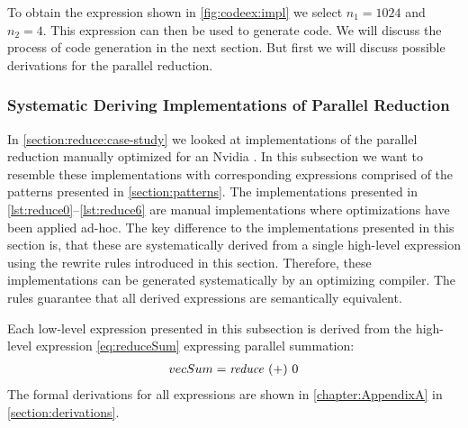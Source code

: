 To obtain the expression shown in \autoref{fig:codeex:impl} we select $n_1=1024$ and $n_2=4$.
This expression can then be used to generate \OpenCL code.
We will discuss the process of \OpenCL code generation in the next section.
But first we will discuss possible derivations for the parallel reduction.












\subsubsection{Systematic Deriving Implementations of Parallel Reduction}

In \autoref{section:reduce:case-study} we looked at implementations of the parallel reduction manually optimized for an Nvidia \GPU.
In this subsection we want to resemble these implementations with corresponding expressions comprised of the patterns presented in \autoref{section:patterns}.
The implementations presented in \autoref{lst:reduce0}--\autoref{lst:reduce6} are manual implementations where optimizations have been applied ad-hoc.
The key difference to the implementations presented in this section is, that these are systematically derived from a single high-level expression using the rewrite rules introduced in this section.
Therefore, these implementations can be generated systematically by an optimizing compiler.
The rules guarantee that all derived expressions are semantically equivalent.

Each \OpenCL low-level expression presented in this subsection is derived from the high-level expression \autoref{eq:reduceSum} expressing parallel summation:
\begin{align}
  vecSum = \text{\textit{reduce}}\ (+)\ 0
  \label{eq:reduceSum}
\end{align}
%
The formal derivations for all expressions are shown in \autoref{chapter:AppendixA} in \autoref{section:derivations}.

